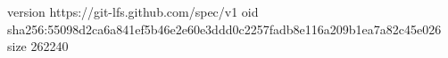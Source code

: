 version https://git-lfs.github.com/spec/v1
oid sha256:55098d2ca6a841ef5b46e2e60e3ddd0c2257fadb8e116a209b1ea7a82c45e026
size 262240
